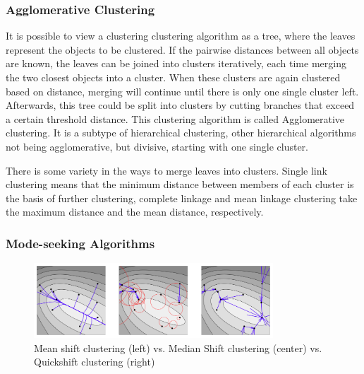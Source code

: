 \subsubsection{Agglomerative Clustering} %
\label{sub:agglomerative_clustering}
It is possible to view a clustering clustering algorithm as a tree, where the leaves represent the objects to be clustered. If the pairwise distances between all objects are known, the leaves can be joined into clusters iteratively, each time merging the two closest objects into a cluster. When these clusters are again clustered based on distance, merging will continue until there is only one single cluster left. Afterwards, this tree could be split into clusters by cutting branches that exceed a certain threshold distance. This clustering algorithm is called Agglomerative clustering. It is a subtype of hierarchical clustering, other hierarchical algorithms not being agglomerative, but divisive, starting with one single cluster.

There is some variety in the ways to merge leaves into clusters. Single link clustering means that the minimum distance between members of each cluster is the basis of further clustering, complete linkage and mean linkage clustering take the maximum distance and the mean distance, respectively.



\subsubsection{Mode-seeking Algorithms} %
\label{sub:mode_finding_algorithms}


\begin{figure}[hbt]
    \centering
    \includegraphics[width=0.8\textwidth]{MeanshiftMedianshiftQuickshift}
    \caption{Mean shift clustering (left) vs. Median Shift clustering (center) vs. Quickshift clustering (right)}
    \label{fig:meanshift_median_shift_quickshift}
\end{figure}



